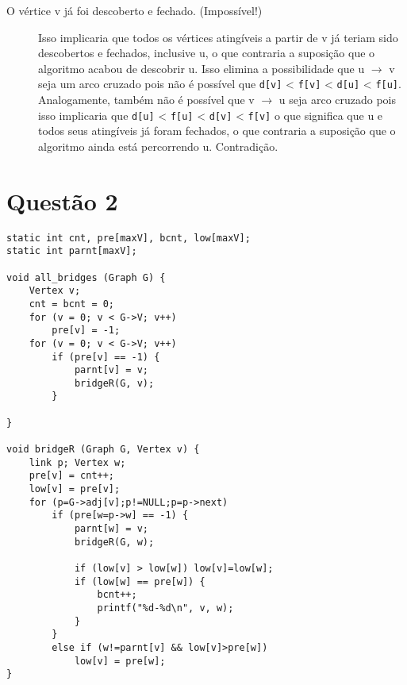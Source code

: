 \documentclass[12pt, a4paper, oneside]{article}
\begin{document}
\begin{description}
  \item [O vértice v já foi descoberto e fechado. (Impossível!)] \hfill
  
  Isso implicaria que todos os vértices atingíveis a partir de v já teriam sido
  descobertos e fechados, inclusive u, o que contraria a suposição que o
  algoritmo acabou de descobrir u. Isso elimina a possibilidade que u
  $\rightarrow$ v seja um arco cruzado pois não é possível que \texttt{d[v]} <
  \texttt{f[v]} < \texttt{d[u]} < \texttt{f[u]}. Analogamente, também não é
  possível que v $\rightarrow$ u seja arco cruzado pois isso implicaria que
  \texttt{d[u]} < \texttt{f[u]} < \texttt{d[v]} < \texttt{f[v]} o que significa
  que u e todos seus atingíveis já foram fechados, o que contraria a suposição
  que o algoritmo ainda está percorrendo u. Contradição.
\end{description}

\section*{Questão 2}
\begin{lstlisting}
static int cnt, pre[maxV], bcnt, low[maxV];
static int parnt[maxV];

void all_bridges (Graph G) {
	Vertex v;
	cnt = bcnt = 0;
	for (v = 0; v < G->V; v++)
		pre[v] = -1;
	for (v = 0; v < G->V; v++)
		if (pre[v] == -1) {
			parnt[v] = v;
			bridgeR(G, v);
		}
	
}

void bridgeR (Graph G, Vertex v) {
	link p; Vertex w;
	pre[v] = cnt++;
	low[v] = pre[v];
	for (p=G->adj[v];p!=NULL;p=p->next)
		if (pre[w=p->w] == -1) {
			parnt[w] = v;
			bridgeR(G, w);
			
			if (low[v] > low[w]) low[v]=low[w];
			if (low[w] == pre[w]) {
				bcnt++;
				printf("%d-%d\n", v, w);
			}
		}
		else if (w!=parnt[v] && low[v]>pre[w])
			low[v] = pre[w];
}
\end{lstlisting}
\end{document}

